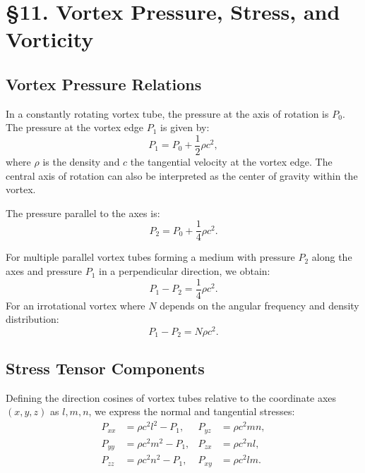 

    \section*{§11. Vortex Pressure, Stress, and Vorticity}

    \subsection*{Vortex Pressure Relations}
    In a constantly rotating vortex tube, the pressure at the axis of rotation is $P_0$. The pressure at the vortex edge $P_1$ is given by:
    \begin{equation}
        P_1 = P_0 + \frac{1}{2} \rho c^2,
    \end{equation}
    where $\rho$ is the density and $c$ the tangential velocity at the vortex edge. The central axis of rotation can also be interpreted as the center of gravity within the vortex.

    The pressure parallel to the axes is:
    \begin{equation}
        P_2 = P_0 + \frac{1}{4} \rho c^2.
    \end{equation}

    For multiple parallel vortex tubes forming a medium with pressure $P_2$ along the axes and pressure $P_1$ in a perpendicular direction, we obtain:
    \begin{equation}
        P_1 - P_2 = \frac{1}{4} \rho c^2.
    \end{equation}
    For an irrotational vortex where $N$ depends on the angular frequency and density distribution:
    \begin{equation}
        P_1 - P_2 = N \rho c^2.
    \end{equation}

    \subsection*{Stress Tensor Components}
    Defining the direction cosines of vortex tubes relative to the coordinate axes $(x, y, z)$ as $l, m, n$, we express the normal and tangential stresses:
    \begin{align}
        P_{xx} &= \rho c^2 l^2 - P_1, & P_{yz} &= \rho c^2 m n, \\
        P_{yy} &= \rho c^2 m^2 - P_1, & P_{zx} &= \rho c^2 n l, \\
        P_{zz} &= \rho c^2 n^2 - P_1, & P_{xy} &= \rho c^2 l m.
    \end{align}

